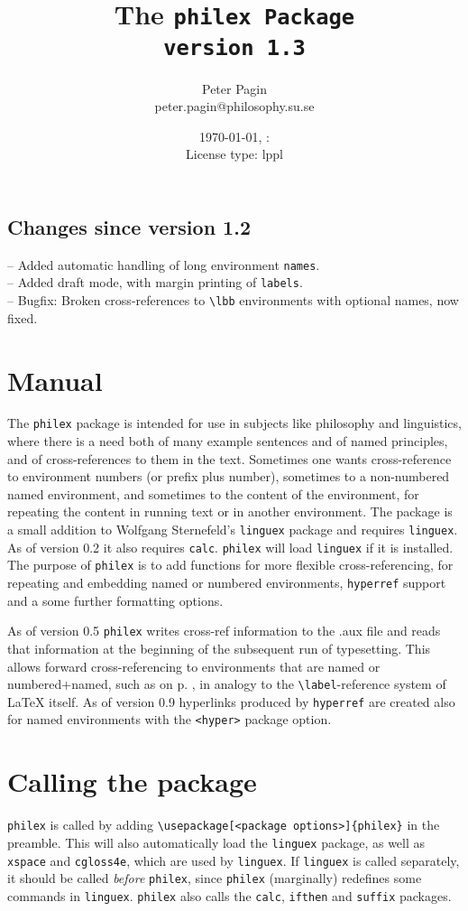 \documentclass[11pt]{article}
\makeatletter
\newcommand{\emp}{\emph}
\def\now{\nowh:\nowm\\License type: lppl}
\def\aut{Peter Pagin\\ peter.pagin@philosophy.su.se}
\makeatother
\begin{document}
\title{The \tt philex \rm Package \\ version 1.3}
\author{\aut}
\date{\today, \now}
\maketitle
\reversemarginpar
\setlength{\marginparwidth}{3cm}
\subsection*{Changes since version 1.2}
-- Added automatic handling of long environment \verb+names+.\\
-- Added draft mode, with margin printing of \verb+labels+.\\
-- Bugfix: Broken cross-references to \verb+\lbb+ environments with optional names, now fixed.


\section*{Manual}
The \verb+philex+ package is intended for use in subjects like philosophy and linguistics, where there is a need both of many example sentences and of named principles, and of cross-references to them in the text. Sometimes one wants cross-reference to environment numbers (or prefix plus number), sometimes to a non-numbered named environment, and sometimes to the content of the environment, for repeating the content in running text or in another environment. The package is a small addition to Wolfgang Sternefeld's \verb+linguex+ package and requires \verb+linguex+. As of version 0.2 it also requires \verb+calc+. \verb+philex+ will load \verb+linguex+ if it is installed. The purpose of \verb+philex+ is to add functions for more flexible cross-referencing, for repeating and embedding named or numbered environments, \verb+hyperref+ support and a some further formatting options.

As of version 0.5 \verb+philex+ writes cross-ref information to the .aux file and reads that information at the beginning of the subsequent run of typesetting. This allows forward cross-referencing to environments that are named or numbered+named, such as  on p. \pageref{clauses}, 
in analogy to the \verb+\label+-reference system of LaTeX itself. As of version 0.9 hyperlinks produced by \verb+hyperref+ are created also for named environments with the \verb+<hyper>+ package option.

\section{Calling the package}
\verb+philex+ is  called by adding \verb+\usepackage[<package options>]{philex}+ in the preamble. This will also automatically load the \verb+linguex+ package, as well as \verb+xspace+ and \verb+cgloss4e+, which are used by \verb+linguex+. If \verb+linguex+ is called separately, it should be called \emp{before} \verb+philex+, since \verb+philex+ (marginally) redefines some commands in \verb+linguex+. \verb+philex+ also calls the \verb+calc+, \verb+ifthen+ and \verb+suffix+ packages.
\end{document}
